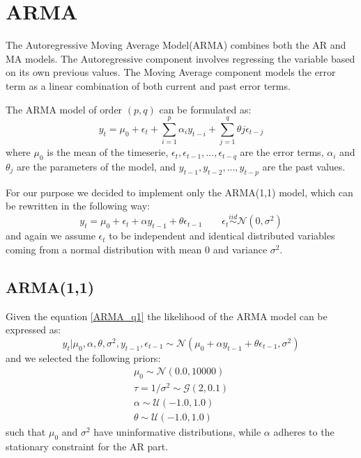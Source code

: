 \section{ARMA}
\label{sec:ARMA}
The Autoregressive Moving Average Model(ARMA) combines both the AR and MA models. The Autoregressive component involves regressing the variable based on its own previous values. The Moving Average component models the error term as a linear combination of both current and past error terms.

The ARMA model of order $(p,q)$ can be formulated as:
\begin{equation}
    y_{t}=\mu_{0}+\epsilon_t +\sum^{p}_{i=1}\alpha_{i} y_{t-i} + \sum^{q}_{j=1}\theta{j} \epsilon_{t-j}
\end{equation}
where $\mu_{0}$ is the mean of the timeserie, $\epsilon_{t}, \epsilon_{t-1}, ..., \epsilon_{t-q}$ are the error terms, $\alpha_{i}$ and $\theta_{j}$ are the parameters of the model, and $y_{t-1}, y_{t-2}, ..., y_{t-p}$ are the past values.

For our purpose we decided to implement only the ARMA(1,1) model, which can be rewritten in the following way:
\begin{equation}
    \label{ARMA_q1}
    y_{t}=\mu_{0}+\epsilon_t +\alpha y_{t-1} + \theta \epsilon_{t-1} \qquad 
    \epsilon_t \stackrel{iid}{\sim} \mathcal{N}(0,\sigma^2)
\end{equation}
and again we assume $\epsilon_{t}$ to be independent and identical distributed variables coming from a normal distribution with mean $0$ and variance $\sigma^2$.
\subsection*{ARMA(1,1)}
Given the equation \ref{ARMA_q1} the likelihood of the ARMA model can be expressed as:
\begin{equation}
    y_{t}|\mu_{0},\alpha,\theta,\sigma^2,y_{t-1},\epsilon_{t-1}\sim \mathcal{N}(\mu_{0} + \alpha y_{t-1} + \theta \epsilon_{t-1}, \sigma^2)
\end{equation}
and we selected the following priors:
\begin{equation}
    \begin{split}
        \mu_0 \sim \mathcal{N}(0.0, 10000) \\
        \tau = 1 / \sigma^2 \sim \mathcal{G}(2, 0.1) \\
        \alpha \sim \mathcal{U}(-1.0, 1.0) \\
        \theta \sim \mathcal{U}(-1.0, 1.0)
    \end{split}
\end{equation}
such that $\mu_{0}$ and $\sigma^2$ have uninformative distributions, while $\alpha$ adheres to the stationary constraint for the AR part.

